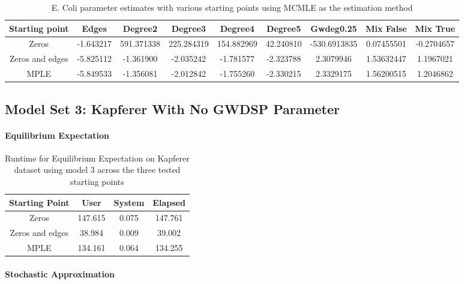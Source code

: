 \begin{table}[H]
\centering
\scriptsize
\begin{tabular}{|| c | c | c | c | c | c | c | c | c ||}
\hline
Starting point & Edges & Degree2 & Degree3 & Degree4 & Degree5 & Gwdeg0.25 & Mix False & Mix True \\
\hline
Zeros & -1.643217 & 591.371338 & 225.284319 & 154.882969 & 42.240810 & -530.6913835 & 0.07455501 & -0.2704657 \\
\hline
Zeros and edges & -5.825112 & -1.361900 & -2.035242 & -1.781577 & -2.323788 & 2.3079946 & 1.53632447 & 1.1967021 \\
\hline
MPLE & -5.849533	 & -1.356081 & -2.012842 & -1.755260 & -2.330215 & 2.3329175 & 1.56200515 & 1.2046862 \\
\hline
\end{tabular}
\label{t2:params_ecoli_mcmle}
\caption{E. Coli parameter estimates with various starting points using MCMLE as the estimation method}
\end{table}


\subsection{Model Set 3: Kapferer With No GWDSP Parameter}

\paragraph{Equilibrium Expectation}

\begin{table}[H]
\centering
\begin{tabular}{||c|c|c|c||}
\hline
Starting Point & User & System & Elapsed \\
\hline
Zeros & 147.615	& 0.075	& 147.761 \\
\hline
Zeros and edges & 38.984 & 0.009 & 39.002 \\
\hline
MPLE & 134.161 & 0.064 & 134.255 \\
\hline
\end{tabular}
\label{t:runtimes_kap1_ee}
\caption{Runtime for Equilibrium Expectation on Kapferer dataset using model 3 across the three tested starting points}
\end{table}


\paragraph{Stochastic Approximation}

